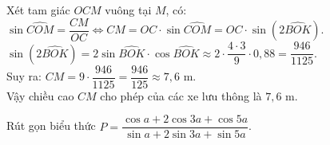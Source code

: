 \begin{ex}
{	Xét tam giác $OCM$ vuông tại $M$, có:\\
	$\sin\widehat{COM}=\dfrac{CM}{OC}\Leftrightarrow CM=OC\cdot \sin\widehat{COM}=OC\cdot \sin\left(2\widehat{BOK}\right)$.\\
	$\sin\left(2\widehat{BOK}\right)=2\sin\widehat{BOK}\cdot \cos\widehat{BOK}\approx 2\cdot \dfrac{4\cdot3}{9}\cdot 0{,}88=\dfrac{946}{1125}$.\\
	Suy ra: $CM=9\cdot\dfrac{946}{1125}=\dfrac{946}{125}\approx 7{,}6$ m.\\
	Vậy chiều cao $CM$ cho phép của các xe lưu thông là $7{,}6$ m.}
\end{ex}


\begin{ex}%
Rút gọn biểu thức $P = \dfrac{\cos a + 2\cos 3a + \cos 5a}{\sin a + 2\sin 3a + \sin 5a}$.
\end{ex}

